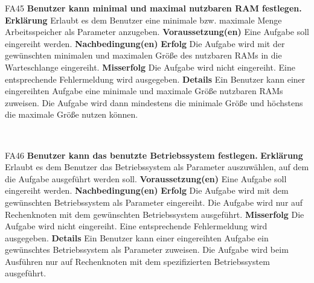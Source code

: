 \documentclass[a4paper,12pt]{article}
\begin{document}
\begin{itemize}[nosep]
	\begin{minipage}[t]{\linewidth}
		\item[FA45] \textbf{Benutzer kann minimal und maximal nutzbaren RAM festlegen.}
		\subitem \textbf{Erklärung} Erlaubt es dem \gls{Benutzer} eine minimale bzw. maximale Menge Arbeitsspeicher als Parameter anzugeben.
		\subitem \textbf{Voraussetzung(en)} Eine Aufgabe soll eingereiht werden.
		\subitem \textbf{Nachbedingung(en)}
		\subsubitem \textbf{Erfolg} Die Aufgabe wird mit der gewünschten minimalen und maximalen Größe des nutzbaren RAMs in die Warteschlange eingereiht.
		\subsubitem \textbf{Misserfolg} Die Aufgabe wird nicht eingereiht. Eine entsprechende Fehlermeldung wird ausgegeben.
		\subitem \textbf{Details} Ein \gls{Benutzer} kann einer eingereihten Aufgabe eine minimale und maximale Größe nutzbaren RAMs zuweisen. Die Aufgabe wird dann mindestens die minimale Größe und höchstens die maximale Größe nutzen können.
	\end{minipage}
	\newline
	\\
	
	\begin{minipage}[t]{\linewidth}
		\item[FA46] \textbf{Benutzer kann das benutzte Betriebssystem festlegen.}
		\subitem \textbf{Erklärung} Erlaubt es dem \gls{Benutzer} das Betriebssystem als Parameter auszuwählen, auf dem die Aufgabe ausgeführt werden soll.
		\subitem \textbf{Voraussetzung(en)} Eine Aufgabe soll eingereiht werden.
		\subitem \textbf{Nachbedingung(en)}
		\subsubitem \textbf{Erfolg} Die Aufgabe wird mit dem gewünschten Betriebssystem als Parameter eingereiht. Die Aufgabe wird nur auf Rechenknoten mit dem gewünschten Betriebssystem ausgeführt.
		\subsubitem \textbf{Misserfolg} Die Aufgabe wird nicht eingereiht. Eine entsprechende Fehlermeldung wird ausgegeben.
		\subitem \textbf{Details} Ein \gls{Benutzer} kann einer eingereihten Aufgabe ein gewünschtes Betriebssystem als Parameter zuweisen. Die Aufgabe wird beim Ausführen nur auf Rechenknoten mit dem spezifizierten Betriebssystem ausgeführt.
	\end{minipage}
	\newline
	\\
	

\end{itemize}
\end{document}
